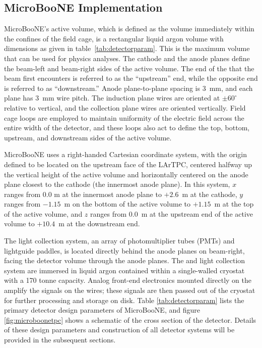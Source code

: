  


\subsection{MicroBooNE \lartpc Implementation}

MicroBooNE's \lartpc active volume, which is defined as the volume immediately within the confines of the \lartpc field cage, is a rectangular liquid argon volume with dimensions as given in table~\ref{tab:detectorparam}. This is the maximum volume that can be used for physics analyses.  The cathode and the anode planes define the beam-left and beam-right sides of the active volume.  The end of the \lartpc that the beam first encounters is referred to as the ``upstream'' end, while the opposite end is referred to as ``downstream.''  Anode plane-to-plane spacing is 3~mm, and each plane has 3~mm wire pitch. The induction plane wires are oriented at $\pm60^{\circ}$ relative to vertical, and the collection plane wires are oriented vertically. Field cage loops are employed to maintain uniformity of the electric field across the entire width of the detector, and these loops also act to define the top, bottom, upstream, and downstream sides of the active volume.  

MicroBooNE uses a right-handed Cartesian coordinate system, with the origin defined to be located on the upstream face of the LArTPC, centered halfway up the vertical height of the active volume and horizontally centered on the anode plane closest to the cathode (the innermost anode plane).  In this system, $x$ ranges from 0.0 m at the innermost anode plane to $+2.6$~m at the cathode, $y$ ranges from $-1.15$~m on the bottom of the active volume to $+1.15$~m at the top of the active volume, and $z$ ranges from 0.0~m at the upstream end of the active volume to $+10.4$~m at the downstream end.  

The light collection system, an array of photomultiplier tubes (PMTs) and lightguide paddles, is located directly behind the anode planes on beam-right, facing the detector volume through the anode planes.  The \lartpc and light collection system are immersed in liquid argon contained within a single-walled cryostat with a 170 tonne capacity.  Analog front-end electronics mounted directly on the \lartpc amplify the signals on the wires; these signals are then passed out of the cryostat for further processing and storage on disk.  Table \ref{tab:detectorparam} lists the primary detector design parameters of MicroBooNE, and figure \ref{fig:microboonetpc} shows a schematic of the cross section of the detector. Details of these design parameters and construction of all detector systems will be provided in the subsequent sections.

